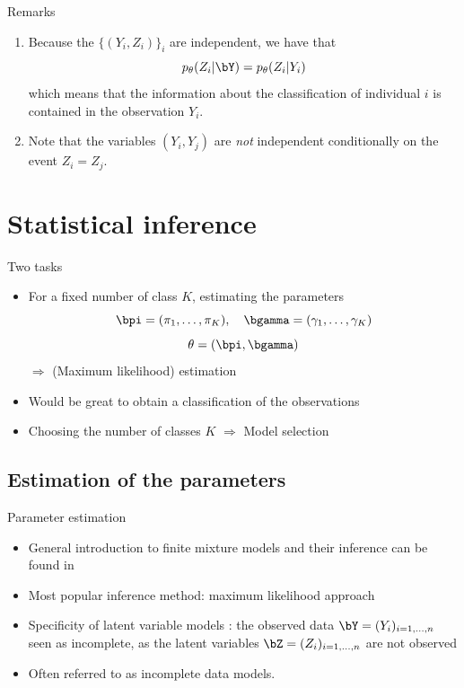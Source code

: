 \documentclass[compress,10pt]{beamer}
\begin{document}
\begin{frame}{Remarks}\label{Rq:MixtureInd}
\begin{enumerate}
\item Because the $\{(Y_i, Z_i)\}_i$ are independent, we have that
  $$
  p_\theta(Z_i |\bY) = p_\theta(Z_i | Y_i)
  $$
  which means that the information about the classification of individual $i$ is contained in the observation $Y_i$.
\item Note that the variables $(Y_i, Y_j)$ are {\sl not} independent conditionally on the event $Z_i=Z_j$.
\end{enumerate}
% 

\end{frame}

\section{Statistical inference}

\begin{frame}{Two tasks}

\begin{itemize}
\item For a fixed number of class $K$, estimating the parameters 
$$ \bpi = (\pi_1, \dots, \pi_K),\quad \bgamma = (\gamma_1, \dots, \gamma_K)$$
$$\theta = (\bpi,\bgamma)$$
 \textcolor{dgreen}{$\Rightarrow$ (Maximum likelihood) estimation}
\item Would be great to obtain a classification of the observations
 \item Choosing the number of classes $K$ \textcolor{dgreen}{$\Rightarrow$ Model selection}
\end{itemize}
\end{frame}


\subsection{Estimation of the parameters} 
\begin{frame}{Parameter estimation}
 \begin{itemize}
 \item General introduction to finite mixture models and their inference can be found in  \cite{MCLA2000}
 \item Most popular inference method: maximum likelihood approach
 \item Specificity of latent variable models : 
  the observed data $\bY = (Y_i)_{i=1,\dots,n}$  seen as {\color{dgreen} incomplete}, as the latent variables $\bZ = (Z_i)_{i=1,\dots,n}$ are not observed
  \item Often referred to as {\color{dgreen} incomplete data models.}
 \end{itemize}
\end{frame}
\end{document}
